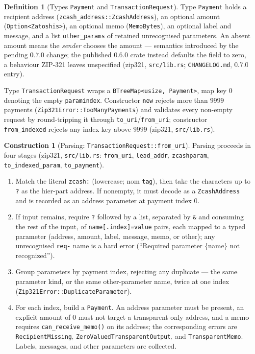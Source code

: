 \documentclass[11pt,a4paper]{article}
\theoremstyle{definition}
\newtheorem{definition}[theorem]{Definition}
\newtheorem{construction}[theorem]{Construction}
\begin{document}
\begin{definition}[Types \texttt{Payment} and \texttt{TransactionRequest}]
\label{def:zip321-types}
Type \texttt{Payment} holds a recipient address
(\texttt{zcash\_address::ZcashAddress}), an optional amount
(\texttt{Option<Zatoshis>}), an optional memo (\texttt{MemoBytes}), an
optional label and message, and a list \texttt{other\_params} of retained
unrecognised parameters. An absent amount means the \emph{sender} chooses
the amount --- semantics introduced by the pending $0.7.0$ change; the
published $0.6.0$ crate instead defaults the field to zero, a behaviour
ZIP-321 leaves unspecified (\textsf{zip321}, \texttt{src/lib.rs};
\texttt{CHANGELOG.md}, $0.7.0$ entry).

Type \texttt{TransactionRequest} wraps a
\texttt{BTreeMap<usize, Payment>}, map key $0$ denoting the empty
\texttt{paramindex}. Constructor \texttt{new} rejects more than $9999$
payments (\texttt{Zip321Error::TooManyPayments}) and validates every
non-empty request by round-tripping it through
\texttt{to\_uri}/\texttt{from\_uri}; constructor \texttt{from\_indexed}
rejects any index key above $9999$ (\textsf{zip321}, \texttt{src/lib.rs}).
\end{definition}

\begin{construction}[Parsing: \texttt{TransactionRequest::from\_uri}]
\label{def:zip321-parse}
Parsing proceeds in four stages (\textsf{zip321}, \texttt{src/lib.rs}:
\texttt{from\_uri}, \texttt{lead\_addr}, \texttt{zcashparam},
\texttt{to\_indexed\_param}, \texttt{to\_payment}).
\begin{enumerate}[label=(\arabic*)]
\item Match the literal \texttt{zcash:} (lowercase; nom \texttt{tag}),
  then take the characters up to \texttt{?} as the hier-part address. If
  nonempty, it must decode as a \texttt{ZcashAddress} and is recorded as an
  address parameter at payment index $0$.
\item If input remains, require \texttt{?} followed by a list, separated
  by \texttt{\&} and consuming the rest of the input, of
  \texttt{name[.index]=value} pairs, each mapped to a typed parameter
  (address, amount, label, message, memo, or other); any unrecognised
  \texttt{req-} name is a hard error (``Required parameter \{name\} not
  recognized'').
\item Group parameters by payment index, rejecting any duplicate --- the
  same parameter kind, or the same other-parameter name, twice at one index
  (\texttt{Zip321Error::DuplicateParameter}).
\item For each index, build a \texttt{Payment}. An address parameter must
  be present, an explicit amount of $0$ must not target a transparent-only
  address, and a memo requires \texttt{can\_receive\_memo()} on its
  address; the corresponding errors are \texttt{RecipientMissing},
  \texttt{ZeroValuedTransparentOutput}, and \texttt{TransparentMemo}.
  Labels, messages, and other parameters are collected.
\end{enumerate}
\end{construction}
\end{document}
